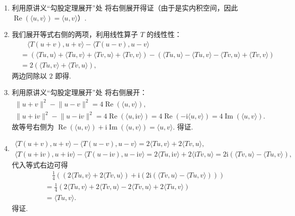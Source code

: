\documentclass[12pt,fontset=fandol]{ctexart}
\begin{document}
\begin{solve}
\begin{enumerate}
        \item 利用原讲义“勾股定理展开”处 将右侧展开得证（由于是实内积空间，因此 $\operatorname{Re}(\langle u, v \rangle) = \langle u, v \rangle$）.

        \item 我们展开等式右侧的两项，利用线性算子 $T$ 的线性性：
        \begin{align*}
            & \quad \langle T(u + v), u + v\rangle - \langle T(u - v), u - v\rangle \\
            & = \left(\langle Tu, u \rangle + \langle Tu, v \rangle + \langle Tv, u \rangle + \langle Tv, v \rangle\right) - \left(\langle Tu, u \rangle - \langle Tu, v \rangle - \langle Tv, u \rangle + \langle Tv, v \rangle\right) \\
            & = 2 (\langle Tu, v \rangle + \langle Tv, u \rangle),
        \end{align*}
        两边同除以 $2$ 即得.

        \item 利用原讲义“勾股定理展开”处 将右侧展开：
        \begin{gather*}
            \lVert u + v \rVert^2 - \lVert u - v \rVert^2 = 4 \operatorname{Re}(\langle u, v \rangle), \\
            \lVert u + \mathrm{i} v \rVert^2 - \lVert u - \mathrm{i} v \rVert^2 = 4 \operatorname{Re}(\langle u, \mathrm{i} v \rangle) = 4 \operatorname{Re}(-\mathrm{i} \langle u, v \rangle) = 4 \operatorname{Im}(\langle u, v \rangle).
        \end{gather*}
        故等号右侧为 $ \operatorname{Re}(\langle u, v \rangle) + \mathrm{i} \operatorname{Im}(\langle u, v \rangle) = \langle u, v \rangle$. 得证.

        \item
        \begin{gather*}
            \langle T(u + v), u + v\rangle - \langle T(u - v), u - v\rangle = 2\langle Tu, v \rangle + 2\langle Tv, u \rangle,\\
            \langle T(u + \mathrm{i} v), u + \mathrm{i} v\rangle - \langle T(u - \mathrm{i} v), u - \mathrm{i} v\rangle = 2\langle Tu, \mathrm{i} v \rangle + 2\langle \mathrm{i} Tv, u \rangle = 2\mathrm{i} (\langle Tv, u \rangle - \langle Tu, v \rangle),
        \end{gather*}
        代入等式右边可得
        \begin{align*}
            &\quad \frac{1}{4}\left(\left(2\langle Tu, v \rangle + 2\langle Tv, u \rangle\right) + \mathrm{i} \left(2\mathrm{i} (\langle Tv, u \rangle - \langle Tu, v \rangle)\right)\right) \\
            & = \frac{1}{4}\left(2\langle Tu, v \rangle + 2\langle Tv, u \rangle - 2\langle Tv, u \rangle + 2\langle Tu, v \rangle\right) \\
            & = \langle Tu, v \rangle.
        \end{align*}
        得证.
    \end{enumerate}
\end{solve}
\end{document}
